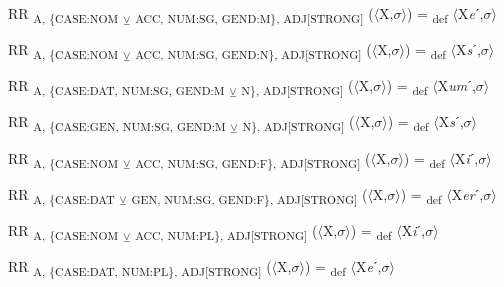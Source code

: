 {\begin{exe}
 RR \textsubscript{A, \{CASE:NOM} \textsubscript{${\veebar}$}\textsubscript{ ACC, NUM:SG, GEND:M\}, ADJ[STRONG]} ($\langle$X,$\sigma $$\rangle$) = \textsubscript{def} $\langle$X\textit{e}ˊ,$\sigma $$\rangle$
\end{exe}

\begin{exe}
 RR \textsubscript{A, \{CASE:NOM} \textsubscript{${\veebar}$}\textsubscript{ ACC, NUM:SG, GEND:N\}, ADJ[STRONG]} ($\langle$X,$\sigma $$\rangle$) = \textsubscript{def} $\langle$X\textit{s}ˊ,$\sigma $$\rangle$
\end{exe}

\begin{exe}
 RR \textsubscript{A, \{CASE:DAT, NUM:SG, GEND:M} \textsubscript{${\veebar}$}\textsubscript{ N\}, ADJ[STRONG]} ($\langle$X,$\sigma $$\rangle$) = \textsubscript{def} $\langle$X\textit{um}ˊ,$\sigma $$\rangle$
\end{exe}

\begin{exe}
 RR \textsubscript{A, \{CASE:GEN, NUM:SG, GEND:M} \textsubscript{${\veebar}$}\textsubscript{ N\}, ADJ[STRONG]} ($\langle$X,$\sigma $$\rangle$) = \textsubscript{def} $\langle$X\textit{s}ˊ,$\sigma $$\rangle$
\end{exe}

\begin{exe}
 RR \textsubscript{A, \{CASE:NOM} \textsubscript{${\veebar}$}\textsubscript{ ACC, NUM:SG, GEND:F\}, ADJ[STRONG]} ($\langle$X,$\sigma $$\rangle$) = \textsubscript{def} $\langle$X\textit{i}ˊ,$\sigma $$\rangle$
\end{exe}

\begin{exe}
 RR \textsubscript{A, \{CASE:DAT} \textsubscript{${\veebar}$}\textsubscript{ GEN, NUM:SG, GEND:F\}, ADJ[STRONG]} ($\langle$X,$\sigma $$\rangle$) = \textsubscript{def} $\langle$X\textit{er}ˊ,$\sigma $$\rangle$
\end{exe}

\begin{exe}
 RR \textsubscript{A, \{CASE:NOM} \textsubscript{${\veebar}$}\textsubscript{ ACC, NUM:PL\}, ADJ[STRONG]} ($\langle$X,$\sigma $$\rangle$) = \textsubscript{def} $\langle$X\textit{i}ˊ,$\sigma $$\rangle$
\end{exe}

\begin{exe}
 RR \textsubscript{A, \{CASE:DAT, NUM:PL\}, ADJ[STRONG]} ($\langle$X,$\sigma $$\rangle$) = \textsubscript{def} $\langle$X\textit{e}ˊ,$\sigma $$\rangle$
\end{exe}

}
